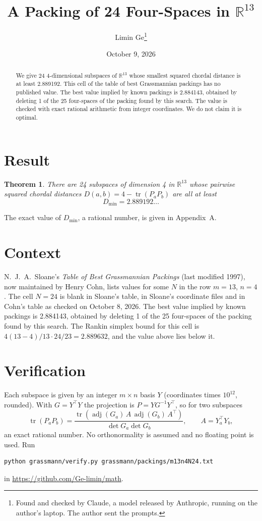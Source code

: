 \documentclass[11pt,a4paper]{article}
\title{A Packing of 24 Four-Spaces in $\mathbb{R}^{13}$}
\author{Limin Ge\thanks{Found and checked by Claude, a model released by Anthropic, running on the author's laptop. The author sent the prompts.}}
\date{October 9, 2026}
\newtheorem*{theorem}{Theorem}
\begin{document}
\maketitle
\begin{abstract}
We give 24 4-dimensional subspaces of $\mathbb{R}^{13}$ whose smallest squared chordal distance is at least 2.889192. This cell of the table of best Grassmannian packings has no published value. The best value implied by known packings is 2.884143, obtained by deleting 1 of the 25 four-spaces of the packing found by this search. The value is checked with exact rational arithmetic from integer coordinates. We do not claim it is optimal.
\end{abstract}

\section{Result}
\begin{theorem}
There are 24 subspaces of dimension 4 in $\mathbb{R}^{13}$ whose pairwise squared chordal distances $D(a,b) = 4 - \operatorname{tr}(P_aP_b)$ are all at least
\[ D_{\min} = 2.889192\ldots \]
\end{theorem}
The exact value of $D_{\min}$, a rational number, is given in Appendix~A.


\section{Context}
N.~J.~A.~Sloane's \emph{Table of Best Grassmannian Packings} (last modified 1997), now maintained by Henry Cohn, lists values for some $N$ in the row $m=13$, $n=4$. The cell $N=24$ is blank in Sloane's table, in Sloane's coordinate files and in Cohn's table as checked on October 8, 2026. The best value implied by known packings is 2.884143, obtained by deleting 1 of the 25 four-spaces of the packing found by this search. The Rankin simplex bound for this cell is $4(13-4)/13\cdot 24/23 = 2.889632$, and the value above lies below it.


\section{Verification}
Each subspace is given by an integer $m\times n$ basis $Y$ (coordinates times $10^{12}$, rounded). With $G=Y^\top Y$ the projection is $P=YG^{-1}Y^\top$, so for two subspaces
\[ \operatorname{tr}(P_aP_b)=\frac{\operatorname{tr}(\operatorname{adj}(G_a)\,A\,\operatorname{adj}(G_b)\,A^\top)}{\det G_a\det G_b},\qquad A=Y_a^\top Y_b, \]
an exact rational number. No orthonormality is assumed and no floating point is used. Run
\begin{verbatim}
python grassmann/verify.py grassmann/packings/m13n4N24.txt
\end{verbatim}
in \url{https://github.com/Ge-limin/math}.
\end{document}
